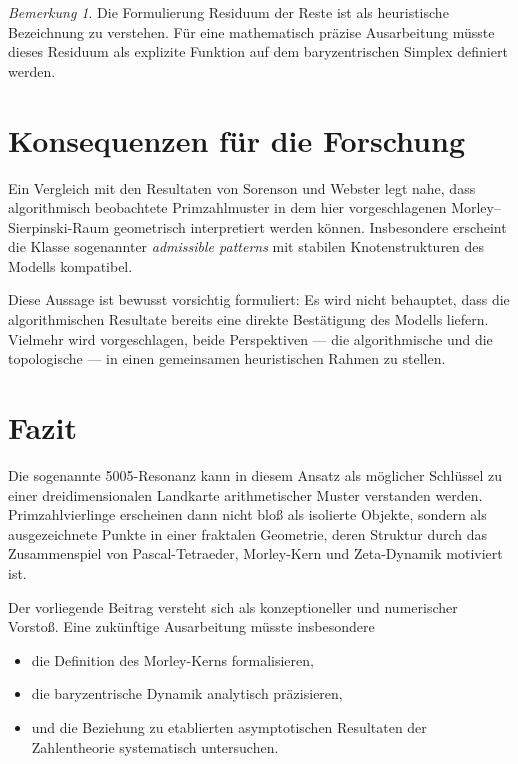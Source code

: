 \documentclass[11pt,a4paper,twocolumn]{article}
\theoremstyle{definition}
\theoremstyle{remark}
\newtheorem{bemerkung}{Bemerkung}
\begin{document}
	\begin{bemerkung}
		Die Formulierung \glqq Residuum der Reste\grqq{} ist als heuristische Bezeichnung
		zu verstehen. Für eine mathematisch präzise Ausarbeitung müsste dieses Residuum
		als explizite Funktion auf dem baryzentrischen Simplex definiert werden.
	\end{bemerkung}
	
	\section{Konsequenzen für die Forschung}
	Ein Vergleich mit den Resultaten von Sorenson und Webster legt nahe, dass
	algorithmisch beobachtete Primzahlmuster in dem hier vorgeschlagenen
	Morley--Sierpinski-Raum geometrisch interpretiert werden können. Insbesondere
	erscheint die Klasse sogenannter \emph{admissible patterns} mit stabilen
	Knotenstrukturen des Modells kompatibel.
	
	Diese Aussage ist bewusst vorsichtig formuliert: Es wird nicht behauptet,
	dass die algorithmischen Resultate bereits eine direkte Bestätigung des
	Modells liefern. Vielmehr wird vorgeschlagen, beide Perspektiven --- die
	algorithmische und die topologische --- in einen gemeinsamen heuristischen
	Rahmen zu stellen.
	
	\section{Fazit}
	Die sogenannte 5005-Resonanz kann in diesem Ansatz als möglicher Schlüssel
	zu einer dreidimensionalen Landkarte arithmetischer Muster verstanden werden.
	Primzahlvierlinge erscheinen dann nicht bloß als isolierte Objekte, sondern
	als ausgezeichnete Punkte in einer fraktalen Geometrie, deren Struktur durch
	das Zusammenspiel von Pascal-Tetraeder, Morley-Kern und Zeta-Dynamik motiviert ist.
	
	Der vorliegende Beitrag versteht sich als konzeptioneller und numerischer
	Vorstoß. Eine zukünftige Ausarbeitung müsste insbesondere
	\begin{itemize}
		\item die Definition des Morley-Kerns formalisieren,
		\item die baryzentrische Dynamik analytisch präzisieren,
		\item und die Beziehung zu etablierten asymptotischen Resultaten
		der Zahlentheorie systematisch untersuchen.
	\end{itemize}
	
	
\end{document}
